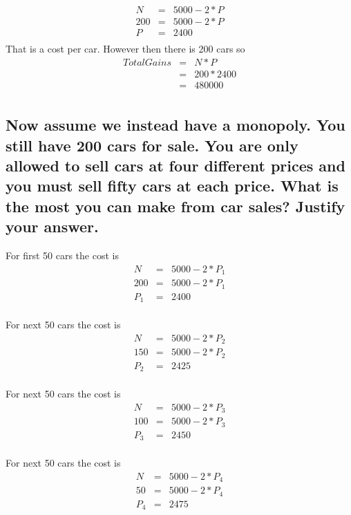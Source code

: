 \documentclass{article}
\begin{document}
\begin{eqnarray*}
N&=&5000-2*P \\
200&=&5000-2*P \\
P&=&2400 \\
\end{eqnarray*}
That is a cost per car. However then there is 200 cars so \\
\begin{eqnarray*}
TotalGains&=& N*P \\
&=& 200 * 2400 \\
&=& 480000 \\
\end{eqnarray*}

\subsection[monopoly]{Now assume we instead have a monopoly. You still have 200 cars for sale. You are only allowed
to sell cars at four different prices and you must sell fifty cars at each price. What is the most
you can make from car sales? Justify your answer.}

For first 50 cars the cost is 
\begin{eqnarray*}
N&=&5000-2*P_1 \\
200&=&5000-2*P_1 \\
P_1&=&2400 \\
\end{eqnarray*}

For next 50 cars the cost is
\begin{eqnarray*}
N&=&5000-2*P_2 \\
150&=&5000-2*P_2 \\
P_2&=&2425 \\
\end{eqnarray*}

For next 50 cars the cost is
\begin{eqnarray*}
N&=&5000-2*P_3 \\
100&=&5000-2*P_3 \\
P_3&=&2450 \\
\end{eqnarray*}

For next 50 cars the cost is
\begin{eqnarray*}
N&=&5000-2*P_4 \\
50&=&5000-2*P_4 \\
P_4&=&2475 \\
\end{eqnarray*}
\end{document}
